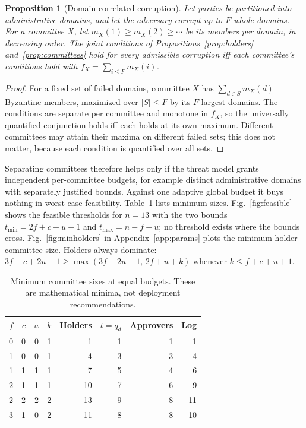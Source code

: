 \documentclass[pdflatex,sn-mathphys-num,twocolumn]{sn-jnl}
\theoremstyle{plain}
\newtheorem{proposition}[theorem]{Proposition}
\theoremstyle{definition}
\begin{document}
\begin{proposition}[Domain-correlated corruption]\label{prop:domains}
Let parties be partitioned into administrative domains, and let the adversary corrupt up to $F$ whole domains. For a committee $X$, let $m_X(1)\ge m_X(2)\ge\cdots$ be its members per domain, in decreasing order. The joint conditions of Propositions~\ref{prop:holders} and~\ref{prop:committees} hold for every admissible corruption iff each committee's conditions hold with $f_X=\sum_{i\le F}m_X(i)$.
\end{proposition}
\begin{proof}
For a fixed set of failed domains, committee $X$ has $\sum_{d\in S}m_X(d)$ Byzantine members, maximized over $|S|\le F$ by its $F$ largest domains. The conditions are separate per committee and monotone in $f_X$, so the universally quantified conjunction holds iff each holds at its own maximum. Different committees may attain their maxima on different failed sets; this does not matter, because each condition is quantified over all sets.
\end{proof}

Separating committees therefore helps only if the threat model grants independent per-committee budgets, for example distinct administrative domains with separately justified bounds. Against one adaptive global budget it buys nothing in worst-case feasibility. Table~\ref{tab:sensitivity} lists minimum sizes. Fig.~\ref{fig:feasible} shows the feasible thresholds for $n=13$ with the two bounds $t_{\min}=2f+c+u+1$ and $t_{\max}=n-f-u$; no threshold exists where the bounds cross. Fig.~\ref{fig:minholders} in Appendix~\ref{app:params} plots the minimum holder-committee size. Holders always dominate: $3f+c+2u+1\ge\max(3f+2u+1,\,2f+u+k)$ whenever $k\le f+c+u+1$.

\begin{table}[htbp]
\caption{Minimum committee sizes at equal budgets. These are mathematical minima, not deployment recommendations.}\label{tab:sensitivity}
\centering\footnotesize\setlength{\tabcolsep}{3.5pt}
\begin{tabular}{@{}rrrrrrrr@{}}\toprule
$f$&$c$&$u$&$k$&Holders&$t=q_d$&Approvers&Log\\\midrule
0&0&0&1&1&1&1&1\\
1&0&0&1&4&3&3&4\\
1&1&1&1&7&5&4&6\\
2&1&1&1&10&7&6&9\\
2&2&2&2&13&9&8&11\\
3&1&0&2&11&8&8&10\\\bottomrule
\end{tabular}
\end{table}
\end{document}

